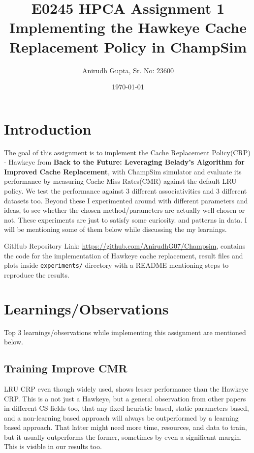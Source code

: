 \documentclass[11pt]{article}
\title{\textbf{E0245 HPCA Assignment 1}\\[0.5em]\Large Implementing the Hawkeye Cache Replacement Policy in ChampSim}
\author{
  Anirudh Gupta, Sr. No: 23600
}
\date{\today}
\begin{document}
\maketitle

\section{Introduction}

The goal of this assignment is to implement the Cache Replacement Policy(CRP) - Hawkeye from \textbf{Back to the Future: Leveraging Belady's Algorithm for Improved Cache Replacement}, with ChampSim simulator and evaluate its performance by measuring Cache Miss Rates(CMR) against the default LRU policy. We test the performance against 3 different associativities and 3 different datasets too. Beyond these I experimented around with different parameters and ideas, to see whether the chosen method/parameters are actually well chosen or not. These experiments are just to satisfy some curiosity. and patterns in data. I will be mentioning some of them below while discussing the my learnings.

GitHub Repository Link: \url{https://github.com/AnirudhG07/Champsim}, contains the code for the implementation of Hawkeye cache replacement, result files and plots inside \texttt{experiments/} directory with a README mentioning steps to reproduce the results.

\section{Learnings/Observations}

Top 3 learnings/observations while implementing this assignment are mentioned below. 

\subsection{Training Improve CMR}

LRU CRP even though widely used, shows lesser performance than the Hawkeye CRP. This is a not just a Hawkeye, but a general observation from other papers in different CS fields too, that any fixed heuristic based, static parameters based, and a non-learning based approach will always be outperformed by a learning based approach. That latter might need more time, resources, and data to train, but it usually outperforms the former, sometimes by even a significant margin. This is visible in our results too.
\end{document}
